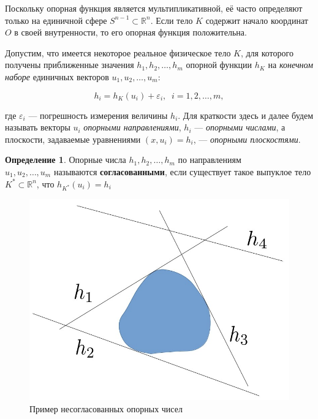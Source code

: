 \documentclass[a4paper, 10pt]{article}
\theoremstyle{definition}
\newtheorem{SmartDefinition}{Определение}
\theoremstyle{plain}
\theoremstyle{plain}
\begin{document}
Поскольку опорная функция является мультипликативной, её часто определяют только
на единичной сфере $S^{n - 1} \subset \mathbb{R}^{n}$. Если тело $K$ содержит
начало координат $O$ в своей внутренности, то его опорная функция положительна.

Допустим, что имеется некоторое реальное физическое тело $K$, для которого
получены приближенные значения $h_{1}, h_{2}, \ldots, h_{m}$ опорной функции
$h_{K}$ на \textit{конечном наборе} единичных векторов
$u_{1}, u_{2}, \ldots, u_{m}$:

\begin{equation}
 h_{i} = h_{K}(u_{i}) + \varepsilon_{i}, \;\; i = 1, 2, \ldots, m,
\end{equation}

где $\varepsilon_{i}$ --- погрешность измерения величины $h_{i}$. Для краткости
здесь и далее будем называть векторы $u_{i}$ \textit{опорными направлениями},
$h_{i}$ --- \textit{опорными числами}, а плоскости, задаваемые уравнениями
$(x, u_{i}) = h_{i}$, --- \textit{опорными плоскостями}.

\begin{SmartDefinition}
 \label{def:consistency}
 Опорные числа $h_{1}, h_{2}, \ldots, h_{m}$ по направлениям \\
 $u_{1}, u_{2}, \ldots, u_{m}$ называются \textbf{согласованными}, если
 существует такое выпуклое тело  $K^{*} \subset \mathbb{R}^{n}$, что
 $h_{K^{*}}(u_{i}) = h_{i}$
\end{SmartDefinition}

\begin{figure}
 \begin{center}
  \includegraphics[scale=0.25]{images/Incosistency-example}
 \end{center}
 \caption{Пример несогласованных опорных чисел}
 \label{image:inconsistent}
\end{figure}
\end{document}
